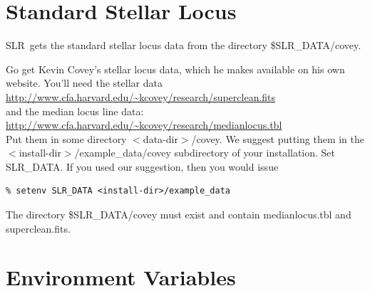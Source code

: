 \documentclass{report}
\newcommand{\slr}{SLR}
\begin{document}




\section{Standard Stellar Locus}

\slr\ gets the standard stellar locus data from the directory
\$SLR\_DATA/covey.

Go get Kevin Covey's stellar locus data, which he makes available on
his own website. You'll need the stellar data\\
\url{http://www.cfa.harvard.edu/~kcovey/research/superclean.fits}\\
and the median locus line data:\\
\url{http://www.cfa.harvard.edu/~kcovey/research/medianlocus.tbl}\\
Put them in some directory $<$data-dir$>$/covey. We suggest putting
them in the $<$install-dir$>$/example\_data/covey subdirectory of
your installation. Set SLR\_DATA. If you used our suggestion, then
you would issue

\begin{verbatim}
% setenv SLR_DATA <install-dir>/example_data
\end{verbatim}

The directory \$SLR\_DATA/covey must exist and contain
medianlocus.tbl and superclean.fits.

\section{Environment Variables}
\end{document}
